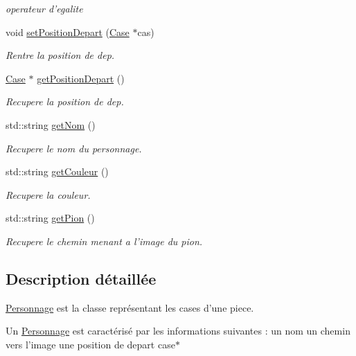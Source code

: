 \begin{DoxyCompactItemize}
\begin{DoxyCompactList}\small\item\em operateur d'egalite \end{DoxyCompactList}\item 
void \hyperlink{classPersonnage_a09a6d250d12b7cde72cef60d6153977d}{set\-Position\-Depart} (\hyperlink{classCase}{\-Case} $\ast$cas)
\begin{DoxyCompactList}\small\item\em \-Rentre la position de dep. \end{DoxyCompactList}\item 
\hyperlink{classCase}{\-Case} $\ast$ \hyperlink{classPersonnage_a94665cc5f3d0e5d3b30e1039d7970f8c}{get\-Position\-Depart} ()
\begin{DoxyCompactList}\small\item\em \-Recupere la position de dep. \end{DoxyCompactList}\item 
std\-::string \hyperlink{classPersonnage_a519301399a9bee1557858aa50a04a85a}{get\-Nom} ()
\begin{DoxyCompactList}\small\item\em \-Recupere le nom du personnage. \end{DoxyCompactList}\item 
std\-::string \hyperlink{classPersonnage_aebbd390a61c946de43685c810d579c42}{get\-Couleur} ()
\begin{DoxyCompactList}\small\item\em \-Recupere la couleur. \end{DoxyCompactList}\item 
std\-::string \hyperlink{classPersonnage_a56fdaf04ef2cebf901c01b284f81f67b}{get\-Pion} ()
\begin{DoxyCompactList}\small\item\em \-Recupere le chemin menant a l'image du pion. \end{DoxyCompactList}\end{DoxyCompactItemize}


\subsection{\-Description détaillée}
\hyperlink{classPersonnage}{\-Personnage} est la classe représentant les cases d'une piece. 

\-Un \hyperlink{classPersonnage}{\-Personnage} est caractérisé par les informations suivantes \-: un nom un chemin vers l'image une position de depart case$\ast$

